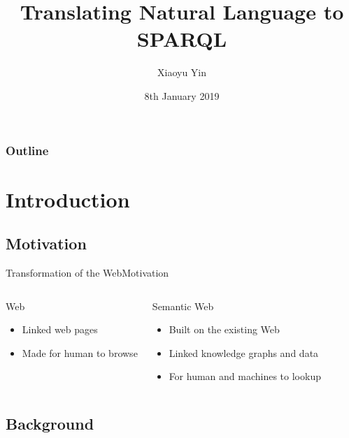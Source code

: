 \documentclass[11pt]{beamer}
\author{Xiaoyu Yin}
\title{Translating Natural Language to SPARQL}
\institute[International Center for Computational Logic]
{
International Center for Computational Logic\\
Technische Universität Dresden
}
\date{8th January 2019}
\begin{document}

\begin{frame}
    \titlepage
\end{frame}

\begin{frame}
    \frametitle{Outline}
    \tableofcontents[hideallsubsections]
\end{frame}

\section{Introduction}

\subsection{Motivation}

\begin{frame}{Transformation of the Web}{Motivation}

    \begin{columns}

        \begin{block}{Web}
        \begin{itemize}
        \item Linked web pages
        \item Made for human to browse
        \end{itemize}
        \end{block}
    \pause
        \begin{block}{Semantic Web}
        \begin{itemize}
        \item Built on the existing Web
        \item Linked knowledge graphs and data
        \item For human and machines to lookup
        \end{itemize}
        \end{block}

    \end{columns}

\end{frame}

\subsection{Background}
\end{document}
